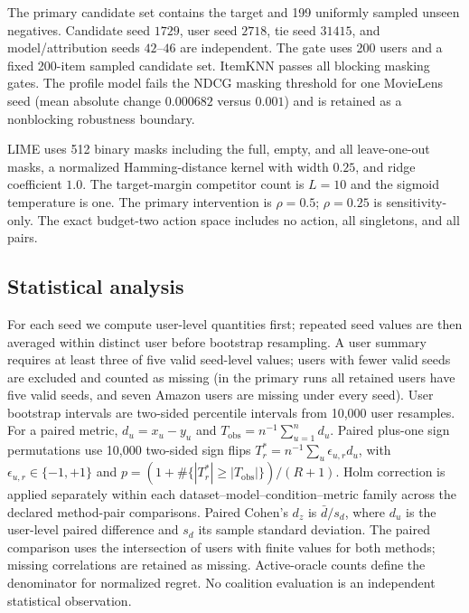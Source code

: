 \documentclass[pdflatex,sn-mathphys-num]{sn-jnl}
\theoremstyle{thmstyleone}
\theoremstyle{thmstyletwo}
\theoremstyle{thmstylethree}
\begin{document}
The primary candidate set contains the target and 199 uniformly sampled unseen negatives. Candidate seed $1729$, user seed $2718$, tie seed $31415$, and model/attribution seeds $42$--$46$ are independent. The gate uses 200 users and a fixed 200-item sampled candidate set. ItemKNN passes all blocking masking gates. The profile model fails the NDCG masking threshold for one MovieLens seed (mean absolute change $0.000682$ versus $0.001$) and is retained as a nonblocking robustness boundary.

LIME uses 512 binary masks including the full, empty, and all leave-one-out masks, a normalized Hamming-distance kernel with width $0.25$, and ridge coefficient $1.0$. The target-margin competitor count is $L=10$ and the sigmoid temperature is one. The primary intervention is $\rho=0.5$; $\rho=0.25$ is sensitivity-only. The exact budget-two action space includes no action, all singletons, and all pairs.

\subsection{Statistical analysis}
For each seed we compute user-level quantities first; repeated seed values are then averaged within distinct user before bootstrap resampling. A user summary requires at least three of five valid seed-level values; users with fewer valid seeds are excluded and counted as missing (in the primary runs all retained users have five valid seeds, and seven Amazon users are missing under every seed). User bootstrap intervals are two-sided percentile intervals from 10,000 user resamples. For a paired metric, $d_u=x_u-y_u$ and $T_{\mathrm{obs}}=n^{-1}\sum_{u=1}^{n}d_u$. Paired plus-one sign permutations use 10,000 two-sided sign flips $T_r^*=n^{-1}\sum_u\epsilon_{u,r}d_u$, with $\epsilon_{u,r}\in\{-1,+1\}$ and $p=(1+\#\{|T_r^*|\ge|T_{\mathrm{obs}}|\})/(R+1)$. Holm correction is applied separately within each dataset--model--condition--metric family across the declared method-pair comparisons. Paired Cohen's $d_z$ is $\bar d/s_d$, where $d_u$ is the user-level paired difference and $s_d$ its sample standard deviation. The paired comparison uses the intersection of users with finite values for both methods; missing correlations are retained as missing. Active-oracle counts define the denominator for normalized regret. No coalition evaluation is an independent statistical observation.
\end{document}
